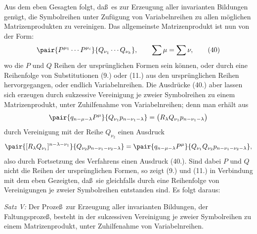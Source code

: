 Aus dem eben Gesagten folgt, da\ss\ es zur Erzeugung aller invarianten Bildungen gen\"ugt, die Symbolreihen unter Zuf\"ugung von Variabelnreihen zu allen m\"oglichen Matrizenprodukten zu vereinigen. Das allgemeinste Matrizenprodukt ist nun von der Form:
\begin{equation}
 \pair{P^{\mu_1}\cdots P^{\mu_i}}{Q_{\nu_1}\cdots Q_{\nu_k}},\qquad \sum\mu=\sum\nu,
\tag{40}
\end{equation}
wo die $P$ und $Q$ Reihen der urspr\"unglichen Formen sein k\"onnen, oder durch eine Reihenfolge von Substitutionen (9.) oder (11.) aus den urspr\"unglichen Reihen hervorgegangen, oder endlich Variabelnreihen. Die Ausdr\"ucke (40.) aber lassen sich erzeugen durch sukzessive Vereinigung je zweier Symbolreihen zu einem Matrizenprodukt, unter Zuhilfenahme von Variabelnreihen; denn man erh\"alt aus
\[
 \pair{q_{n-\mu-\lambda}P^\mu}{Q_{\nu_1}p_{n-\nu_1-\lambda}}
 =\bigl(R_\lambda Q_{\nu_1}p_{n-\nu_1-\lambda}\bigr)
\]
durch Vereinigung mit der Reihe $Q_{\nu_2}$ einen Ausdruck
\[
 \pair{[R_\lambda Q_{\nu_1}]^{n-\lambda-\nu_1}}{Q_{\nu_2}p_{n-\nu_1-\nu_2-\lambda}}
 =\pair{q_{n-\mu-\lambda}P^\mu}{Q_{\nu_1}Q_{\nu_2}p_{n-\nu_1-\nu_2-\lambda}},
\]
also durch Fortsetzung des Verfahrens einen Ausdruck (40.). Sind dabei $P$ und $Q$ nicht die Reihen der urspr\"unglichen Formen, so zeigt (9.) und (11.) in Verbindung mit dem eben Gezeigten, da\ss\ sie gleichfalls durch eine Reihenfolge von Vereinigungen je zweier Symbolreihen entstanden sind. Es folgt daraus:

\emph{Satz V:} Der Proze\ss\ zur Erzeugung aller invarianten Bildungen, der Faltungsproze\ss, besteht in der sukzessiven Vereinigung je zweier Symbolreihen zu einem Matrizenprodukt, unter Zuhilfenahme von Variabelnreihen.

